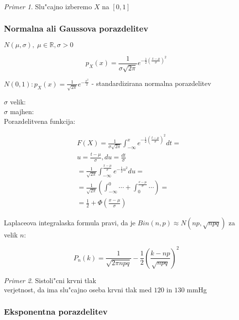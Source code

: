 \documentclass[a4paper,12pt]{article}
\theoremstyle{definition}
\theoremstyle{remark}
\newtheorem*{ex}{Primer}
\newcommand{\R}{\mathbb{R}}
\begin{document}
\begin{ex}
    Slu"cajno izberemo $X$ na $[0,1]$
\end{ex}

\subsubsection{Normalna ali Gaussova porazdelitev}

$N(\mu, \sigma), \; \mu \in \R, \sigma > 0$

\begin{equation*}
    p_X(x) = \frac{1}{\sigma \sqrt{2\pi}} e^{-\frac{1}{2} (\frac{x-\mu}{\sigma})^2}
\end{equation*}

$N(0,1): p_X(x) = \frac{1}{\sqrt{2\pi}} e^{-\frac{x^2}{2}}$ - standardizirana normalna porazdelitev




$\sigma$ velik: \\
$\sigma$ majhen: \\
Porazdelitvena funkcija:

\begin{align*}
    &F(X) = \frac{1}{\sigma \sqrt{2\pi}} \int_{-\infty}^{x} e^{-\frac{1}{2} (\frac{t-\mu}{\sigma})^2} dt = \\
    &u = \frac{t-\mu}{\sigma}, du = \frac{dt}{\sigma} \\
    &= \frac{1}{\sqrt{2\pi}} \int_{-\infty}^{\frac{x-\mu}{\sigma}} e^{-\frac{1}{2}u^2} du = \\
    &= \frac{1}{\sqrt{2\pi}} (\int_{-\infty}^{0} \cdots + \int_{0}^{\frac{x-\mu}{\sigma}} \cdots) = \\
    &= \frac{1}{2} + \Phi(\frac{x-\mu}{\sigma})
\end{align*}

Laplaceova integralaska formula pravi, da je $Bin(n,p) \approx N(np, \sqrt{npq})$ za velik $n:$

\begin{equation*}
    P_n(k) = \frac{1}{\sqrt{2\pi npq}} - \frac{1}{2} (\frac{k - np}{\sqrt{npq}})^2
\end{equation*}

\begin{ex}
    Sistoli"cni krvni tlak \\
    verjetnost, da ima slu"cajno oseba krvni tlak med $120$ in $130$ mmHg
\end{ex}

\subsubsection{Eksponentna porazdelitev}
\end{document}
